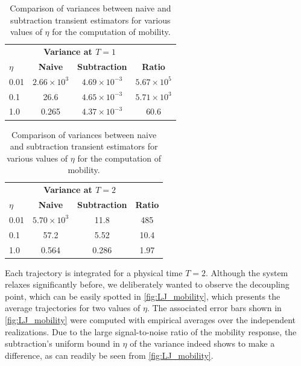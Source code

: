 \documentclass[11pt]{article}
\newcommand\sn[2]{{#1}\times 10^{#2}}
\theoremstyle{definition}
\begin{document}
\begin{table}[h!]
\begin{subtable}[h]{0.45\textwidth}
\centering
\begin{tabular}{@{}lccc@{}}
\toprule
 & \multicolumn{2}{c}{\textbf{Variance at $T=1$}} &  \\
\cmidrule(lr){2-3}
 $\eta$ & \textbf{Naive} & \textbf{Subtraction} & \textbf{Ratio} \\
\midrule
0.01 & $\sn{2.66}{3}$ & $\sn{4.69}{-3}$ & $\sn{5.67}{5}$ \\
0.1  & 26.6   & $\sn{4.65}{-3}$ & $\sn{5.71}{3}$  \\
1.0  & 0.265    & $\sn{4.37}{-3}$ & 60.6    \\
\bottomrule
\end{tabular}
\caption{Data at $T=1$ (start of decoupling)}
\end{subtable}\hfill
\begin{subtable}[h]{0.45\textwidth}
\centering
\begin{tabular}{@{}lccc@{}}
\toprule
 & \multicolumn{2}{c}{\textbf{Variance at $T=2$}} &  \\
\cmidrule(lr){2-3}
 $\eta$ & \textbf{Naive} & \textbf{Subtraction} & \textbf{Ratio} \\
\midrule
0.01 & $\sn{5.70}{3}$ & 11.8 & 485 \\
0.1  & 57.2   & 5.52  & 10.4  \\
1.0  & 0.564    & 0.286  & 1.97   \\
\bottomrule
\end{tabular}
\caption{Data at $T=2$ (total decoupling)}
\end{subtable}
\caption{Comparison of variances between naive and subtraction transient estimators for various values of $\eta$ for the computation of mobility.}
\label{table:LJ_mobility}
\end{table}

Each trajectory is integrated for a physical time $T=2$. Although the system relaxes significantly before, we deliberately wanted to observe the decoupling point, which can be easily spotted in \cref{fig:LJ_mobility}, which presents the average trajectories for two values of $\eta$. The associated error bars shown in \cref{fig:LJ_mobility} were computed with empirical averages over the independent realizations. Due to the large signal-to-noise ratio of the mobility response, the subtraction's uniform bound in $\eta$ of the variance indeed shows to make a difference, as can readily be seen from \cref{fig:LJ_mobility}.
\end{document}
